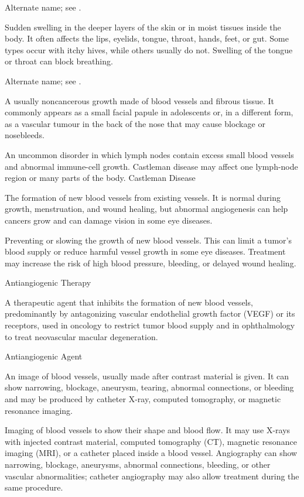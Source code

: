  Alternate name; see .

 Sudden swelling in the deeper layers of the skin or in
moist tissues inside the body. It often affects the lips, eyelids, tongue,
throat, hands, feet, or gut. Some types occur with itchy hives, while others
usually do not. Swelling of the tongue or throat can block breathing.

 Alternate name; see .

 A usually noncancerous growth made of blood vessels and fibrous tissue. It commonly appears as a small facial papule in adolescents or, in a different form, as a vascular tumour in the back of the nose that may cause blockage or nosebleeds.

 An uncommon disorder in which lymph nodes contain excess small blood vessels and abnormal immune-cell growth. Castleman disease may affect one lymph-node region or many parts of the body.
\synonyms
Castleman Disease

 The formation of new blood vessels from existing vessels. It is normal during growth, menstruation, and wound healing, but abnormal angiogenesis can help cancers grow and can damage vision in some eye diseases.

 Preventing or slowing the growth of new blood vessels. This can limit a tumor’s blood supply or reduce harmful vessel growth in some eye diseases. Treatment may increase the risk of high blood pressure, bleeding, or delayed wound healing.

\synonyms
Antiangiogenic Therapy

 A therapeutic agent that inhibits the formation of new blood vessels, predominantly by antagonizing vascular endothelial growth factor (VEGF) or its receptors, used in oncology to restrict tumor blood supply and in ophthalmology to treat neovascular macular degeneration.

\synonyms
Antiangiogenic Agent

 An image of blood vessels, usually made after contrast material is given. It can show narrowing, blockage, aneurysm, tearing, abnormal connections, or bleeding and may be produced by catheter X-ray, computed tomography, or magnetic resonance imaging.

 Imaging of blood vessels to show their shape and blood flow. It may use X-rays with injected contrast material, computed tomography (CT), magnetic resonance imaging (MRI), or a catheter placed inside a blood vessel. Angiography can show narrowing, blockage, aneurysms, abnormal connections, bleeding, or other vascular abnormalities; catheter angiography may also allow treatment during the same procedure.

